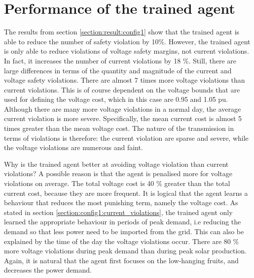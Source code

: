 \documentclass[class=book, crop=false]{standalone}
\begin{document}
\section{Performance of the trained agent}
The results from section \ref{section:result:config1} show that the trained agent is able to reduce the number of safety violation by 10\%. However, the trained agent is only able to reduce violations of voltage safety margins, not current violations. In fact, it increases the number of current violations by 18 \%. Still, there are large differences in terms of the quantity and magnitude of the current and voltage safety violations. There are almost 7 times more voltage violations than current violations. This is of course dependent on the voltage bounds that are used for defining the voltage cost, which in this case are 0.95 and 1.05 pu. Although there are many more voltage violations in a normal day, the average current violation is more severe. Specifically, the mean current cost is almost 5 times greater than the mean voltage cost. The nature of the transmission in terms of violations is therefore: the current violation are sparse and severe, while the voltage violations are numerous and faint. 

Why is the trained agent better at avoiding voltage violation than current violations? A possible reason is that the agent is penalised more for voltage violations on average. The total voltage cost is 40 \% greater than the total current cost, because they are more frequent. It is logical that the agent learns a behaviour that reduces the most punishing term, namely the voltage cost. As stated in section \ref{section:config1:current_violations}, the trained agent only learned the appropriate behaviour in periods of peak demand, i.e reducing the demand so that less power need to be imported from the grid. This can also be explained by the time of the day the voltage violations occur. There are 80 \% more voltage violations during peak demand than during peak solar production. Again, it is natural that the agent first focuses on the low-hanging fruits, and decreases the power demand.   
\end{document}
